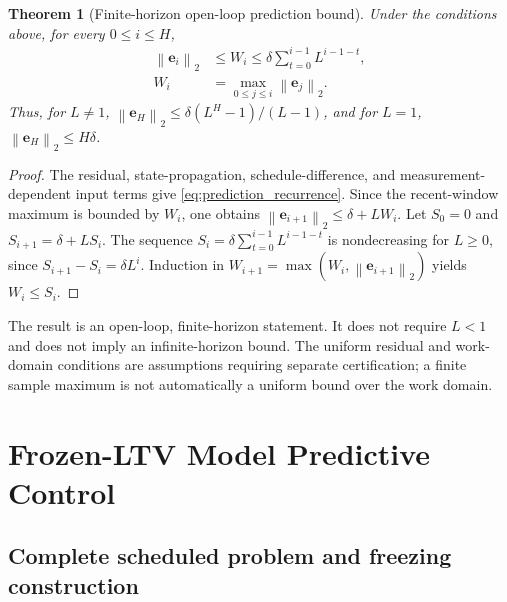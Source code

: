 ﻿\documentclass[journal]{IEEEtran}
\newtheorem{theorem}{Theorem}
\newcommand{\ve}{\mathbf{e}}
\newcommand{\norm}[1]{\left\lVert #1\right\rVert}
\begin{document}
\begin{theorem}[Finite-horizon open-loop prediction bound]
\label{thm:prediction_bound}
Under the conditions above, for every $0\le i\le H$,
\begin{align}
    \norm{\ve_i}_2&\le W_i\le \delta\sum_{t=0}^{i-1}L^{i-1-t},
    \label{eq:prediction_bound}
    \\
    W_i&=\max_{0\le j\le i}\norm{\ve_j}_2.
    \label{eq:prediction_error_maximum}
\end{align}
Thus, for $L\ne1$, $\norm{\ve_H}_2\le\delta(L^H-1)/(L-1)$, and for $L=1$, $\norm{\ve_H}_2\le H\delta$.
\end{theorem}
\begin{proof}
The residual, state-propagation, schedule-difference, and measurement-dependent input terms give \eqref{eq:prediction_recurrence}. Since the recent-window maximum is bounded by $W_i$, one obtains $\norm{\ve_{i+1}}_2\le\delta+LW_i$. Let $S_0=0$ and $S_{i+1}=\delta+LS_i$. The sequence $S_i=\delta\sum_{t=0}^{i-1}L^{i-1-t}$ is nondecreasing for $L\ge0$, since $S_{i+1}-S_i=\delta L^i$. Induction in $W_{i+1}=\max(W_i,\norm{\ve_{i+1}}_2)$ yields $W_i\le S_i$.
\end{proof}

The result is an open-loop, finite-horizon statement. It does not require $L<1$ and does not imply an infinite-horizon bound. The uniform residual and work-domain conditions are assumptions requiring separate certification; a finite sample maximum is not automatically a uniform bound over the work domain.

\section{Frozen-LTV Model Predictive Control}
\label{sec:control}

\subsection{Complete scheduled problem and freezing construction}
\end{document}

